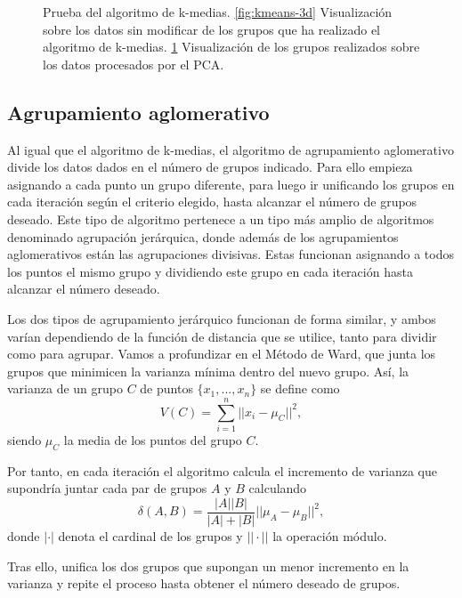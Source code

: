 \begin{figure}[h]
\begin{subfigure}{0.45\textwidth}
    \caption{}
    \label{fig:kmeans-pca}
  \end{subfigure}
  \caption[Prueba del algoritmo de k-medias.]{Prueba del algoritmo de k-medias. \ref{fig:kmeans-3d} Visualización sobre los datos sin modificar de los grupos que ha realizado el algoritmo de k-medias. \ref{fig:kmeans-pca} Visualización de los grupos realizados sobre los datos procesados por el PCA.}
  \label{fig:kmeans}
\end{figure}

\newpage
\subsection{Agrupamiento aglomerativo}

Al igual que el algoritmo de k-medias, el algoritmo de agrupamiento aglomerativo divide los datos dados en el número de grupos indicado. Para ello empieza asignando a cada punto un grupo diferente, para luego ir unificando los grupos en cada iteración según el criterio elegido, hasta alcanzar el número de grupos deseado. Este tipo de algoritmo pertenece a un tipo más amplio de algoritmos denominado agrupación jerárquica, donde además de los agrupamientos aglomerativos están las agrupaciones divisivas. Estas funcionan asignando a todos los puntos el mismo grupo y dividiendo este grupo en cada iteración hasta alcanzar el número deseado.

Los dos tipos de agrupamiento jerárquico funcionan de forma similar, y ambos varían dependiendo de la función de distancia que se utilice, tanto para dividir como para agrupar. Vamos a profundizar en el Método de Ward, que junta los grupos que minimicen la varianza mínima dentro del nuevo grupo. Así, la varianza de un grupo $ C $ de puntos $ \{x_1, ..., x_n\} $ se define como
\begin{equation}
  V(C) = \sum\limits_{i=1}^n || x_i - \mu_C ||^2,
\end{equation}
siendo $ \mu_C $ la media de los puntos del grupo $ C $.

Por tanto, en cada iteración el algoritmo calcula el incremento de varianza que supondría juntar cada par de grupos $ A $ y $ B $ calculando
\begin{equation}
  \delta(A, B) = \frac{|A||B|}{|A|+|B|}||\mu_A - \mu_B||^2,
\end{equation}
donde $ |\cdot| $ denota el cardinal de los grupos y $ || \cdot || $ la operación módulo.

Tras ello, unifica los dos grupos que supongan un menor incremento en la varianza y repite el proceso hasta obtener el número deseado de grupos.


